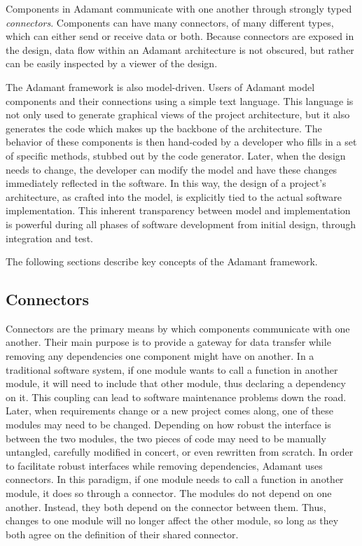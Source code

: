 Components in Adamant communicate with one another through strongly typed \textit{connectors}. Components can have many connectors, of many different types, which can either send or receive data or both. Because connectors are exposed in the design, data flow within an Adamant architecture is not obscured, but rather can be easily inspected by a viewer of the design.

The Adamant framework is also model-driven. Users of Adamant model components and their connections using a simple text language. This language is not only used to generate graphical views of the project architecture, but it also generates the code which makes up the backbone of the architecture. The behavior of these components is then hand-coded by a developer who fills in a set of specific methods, stubbed out by the code generator. Later, when the design needs to change, the developer can modify the model and have these changes immediately reflected in the software. In this way, the design of a project's architecture, as crafted into the model, is explicitly tied to the actual software implementation. This inherent transparency between model and implementation is powerful during all phases of software development from initial design, through integration and test.

The following sections describe key concepts of the Adamant framework.

\subsection{Connectors}

Connectors are the primary means by which components communicate with one another. Their main purpose is to provide a gateway for data transfer while removing any dependencies one component might have on another. In a traditional software system, if one module wants to call a function in another module, it will need to include that other module, thus declaring a dependency on it. This coupling can lead to software maintenance problems down the road. Later, when requirements change or a new project comes along, one of these modules may need to be changed. Depending on how robust the interface is between the two modules, the two pieces of code may need to be manually untangled, carefully modified in concert, or even rewritten from scratch. In order to facilitate robust interfaces while removing dependencies, Adamant uses connectors. In this paradigm, if one module needs to call a function in another module, it does so through a connector. The modules do not depend on one another. Instead, they both depend on the connector between them. Thus, changes to one module will no longer affect the other module, so long as they both agree on the definition of their shared connector.


